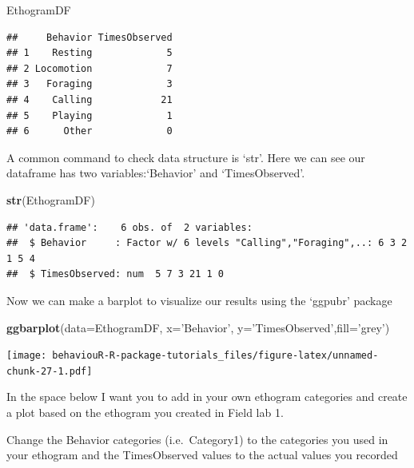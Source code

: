 \documentclass[]{book}
\newenvironment{Shaded}{\begin{snugshade}}{\end{snugshade}}
\newcommand{\DataTypeTok}[1]{\textcolor[rgb]{0.13,0.29,0.53}{#1}}
\newcommand{\KeywordTok}[1]{\textcolor[rgb]{0.13,0.29,0.53}{\textbf{#1}}}
\newcommand{\NormalTok}[1]{#1}
\newcommand{\StringTok}[1]{\textcolor[rgb]{0.31,0.60,0.02}{#1}}
\begin{document}
\begin{Shaded}
\begin{Highlighting}[]
\NormalTok{EthogramDF}
\end{Highlighting}
\end{Shaded}

\begin{verbatim}
##     Behavior TimesObserved
## 1    Resting             5
## 2 Locomotion             7
## 3   Foraging             3
## 4    Calling            21
## 5    Playing             1
## 6      Other             0
\end{verbatim}

A common command to check data structure is `str'. Here we can see our dataframe has two variables:`Behavior' and `TimesObserved'.

\begin{Shaded}
\begin{Highlighting}[]
\KeywordTok{str}\NormalTok{(EthogramDF)}
\end{Highlighting}
\end{Shaded}

\begin{verbatim}
## 'data.frame':    6 obs. of  2 variables:
##  $ Behavior     : Factor w/ 6 levels "Calling","Foraging",..: 6 3 2 1 5 4
##  $ TimesObserved: num  5 7 3 21 1 0
\end{verbatim}

Now we can make a barplot to visualize our results using the `ggpubr' package

\begin{Shaded}
\begin{Highlighting}[]
\KeywordTok{ggbarplot}\NormalTok{(}\DataTypeTok{data=}\NormalTok{EthogramDF, }\DataTypeTok{x=}\StringTok{'Behavior'}\NormalTok{, }\DataTypeTok{y=}\StringTok{'TimesObserved'}\NormalTok{,}\DataTypeTok{fill=}\StringTok{'grey'}\NormalTok{)}
\end{Highlighting}
\end{Shaded}

\texttt{[image: behaviouR-R-package-tutorials\_files/figure-latex/unnamed-chunk-27-1.pdf]}

In the space below I want you to add in your own ethogram categories and create a plot based on the ethogram you created in Field lab 1.

Change the Behavior categories (i.e.~Category1) to the categories you used in your ethogram and the TimesObserved values to the actual values you recorded
\end{document}
